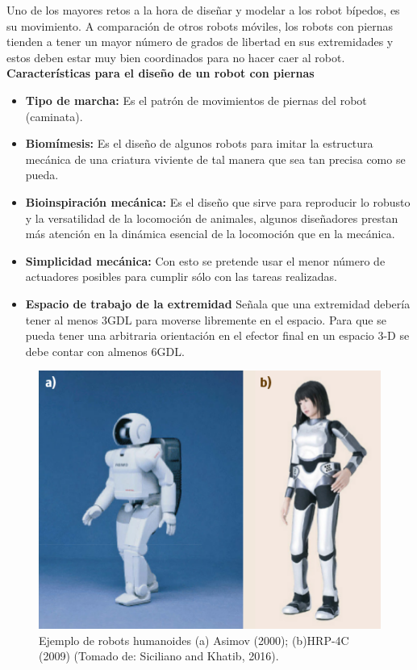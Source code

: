 \documentclass{book}
\begin{document}
Uno de los mayores retos a la hora de diseñar y modelar a los robot bípedos, es su movimiento. A comparación de otros robots móviles, los robots con piernas tienden a tener un mayor número de grados de libertad en sus extremidades y estos deben estar muy bien coordinados para no hacer caer al robot. 
\\

\textbf{Características para el diseño de un robot con piernas}				
\begin{itemize}
\item \textbf{Tipo de marcha:} Es el patrón de movimientos de piernas del robot (caminata).

\item \textbf{Biomímesis:} Es el diseño de algunos robots para imitar la estructura mecánica de una criatura viviente de tal manera que sea tan precisa como se pueda.

\item \textbf{Bioinspiración mecánica:} Es el diseño que sirve para reproducir lo robusto y la versatilidad de la locomoción de animales, algunos diseñadores prestan más atención en la dinámica esencial de la locomoción que en la mecánica.

\item \textbf{Simplicidad mecánica:} Con esto se pretende usar el menor número de actuadores posibles para cumplir sólo con las tareas realizadas.

\item \textbf{Espacio de trabajo de la extremidad } Señala que una extremidad debería tener al menos 3GDL para moverse libremente en el espacio. Para que se pueda tener una arbitraria orientación en el efector final en un espacio 3-D se debe contar con almenos 6GDL.

\end{itemize}



\begin{figure}
	\centering		
	\includegraphics[scale=0.5]{images/asimov_and_HRP-4C.png}
	\caption{Ejemplo de robots humanoides (a) Asimov (2000); (b)HRP-4C (2009) (Tomado de: Siciliano and Khatib, 2016).}		
\label{fig:humanoids}%
\end{figure}
\end{document}

